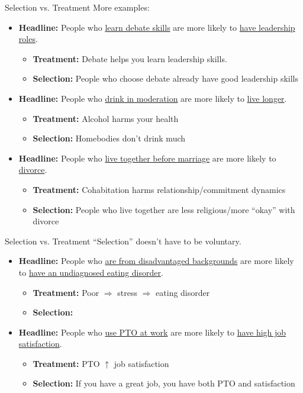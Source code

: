 \begin{frame}{Selection vs. Treatment}
More examples:
\begin{itemize}
    \item \textbf{Headline:} People who \uline{learn debate skills} are more likely to \uline{have leadership roles}.
    \begin{itemize}
        \item \textbf{Treatment:} Debate helps you learn leadership skills.
        \item \textbf{Selection:} People who choose debate already have good leadership skills
    \end{itemize}
    \item \textbf{Headline:} People who \uline{drink in moderation} are more likely to \uline{live longer}.
    \begin{itemize}
        \item \textbf{Treatment:} Alcohol harms your health
        \item \textbf{Selection:} Homebodies don't drink much
    \end{itemize}
    \item \textbf{Headline:} People who \uline{live together before marriage} are more likely to \uline{divorce}.
    \begin{itemize}
        \item \textbf{Treatment:} Cohabitation harms relationship/commitment dynamics
        \item \textbf{Selection:} People who live together are less religious/more ``okay'' with divorce
    \end{itemize}
\end{itemize}
\end{frame}

\begin{frame}{Selection vs. Treatment}
    ``Selection'' doesn't have to be voluntary.
    \begin{itemize}
        \item \textbf{Headline:} People who \uline{are from disadvantaged backgrounds} are more likely to \uline{have an undiagnosed eating disorder}.
        \begin{itemize}
            \item \textbf{Treatment:} Poor $\Rightarrow$ stress $\Rightarrow$ eating disorder
            \item \textbf{Selection:} 
        \end{itemize}
        \item \textbf{Headline:} People who \uline{use PTO at work} are more likely to \uline{have high job satisfaction}.
        \begin{itemize}
            \item \textbf{Treatment:} PTO $\uparrow$ job satisfaction
            \item \textbf{Selection:} If you have a great job, you have both PTO and satisfaction
        \end{itemize}
    \end{itemize}
\end{frame}

